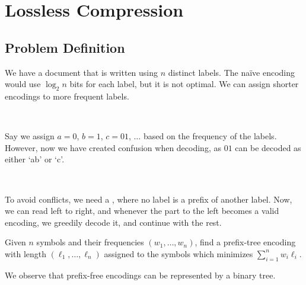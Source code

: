 \section{Lossless Compression}

\subsection{Problem Definition}

\begin{example}
    We have a document that is written using $n$ distinct labels. The na\"ive encoding would use $\log_2 n$ bits for each label, but it is not optimal. We can assign shorter encodings to more frequent labels.

    {~~~}

    Say we assign $a = 0$, $b = 1$, $c = 01$, $\dots$ based on the frequency of the labels. However, now we have created confusion when decoding, as $01$ can be decoded as either `ab' or `c'.

    {~~~}

    To avoid conflicts, we need a , where no label is a prefix of another label. Now, we can read left to right, and whenever the part to the left becomes a valid encoding, we greedily decode it, and continue with the rest.
\end{example}

\begin{definition}\label{def:lossless-compression}
    Given $n$ symbols and their frequencies $(w_1, \dots, w_n)$, find a prefix-tree encoding with length $(\ell_1, \dots, \ell_n)$ assigned to the symbols which minimizes $\displaystyle \sum_{i=1}^n w_i \ell_i$.
\end{definition}

We observe that prefix-free encodings can be represented by a binary tree.

